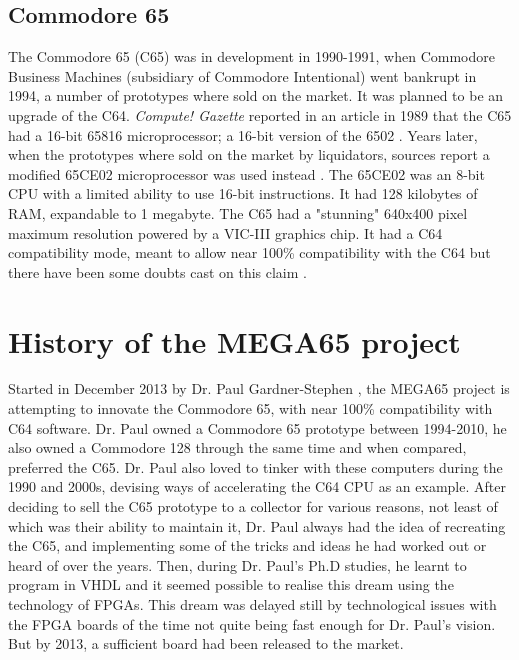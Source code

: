\subsection{Commodore 65}
The Commodore 65 (C65) was in development in 1990-1991, when Commodore Business Machines (subsidiary of Commodore Intentional) went bankrupt in 1994, a number of prototypes where sold on the market. It was planned to be an upgrade of the C64. \textit{Compute! Gazette} reported in an article in 1989 that the C65 had a 16-bit 65816 microprocessor; a 16-bit version of the 6502 
\cite{RN31}. Years later, when the prototypes where sold on the market by liquidators, sources report a modified 65CE02 microprocessor was used instead
\cite{RN30}
\cite{RN78}. The 65CE02 was an 8-bit CPU with a limited ability to use 16-bit instructions. It had 128 kilobytes of RAM, expandable to 1 megabyte. The C65 had a "stunning" 640x400 pixel maximum resolution 
\cite{RN31} powered by a VIC-III graphics chip. It had a C64 compatibility mode, meant to allow near 100\% compatibility with the C64 but there have been some doubts cast on this claim
\cite{RN30}. 

\section{History of the MEGA65 project}
Started in December 2013 by Dr. Paul Gardner-Stephen 
\cite{RN44}, the MEGA65 project is attempting to innovate the Commodore 65, with near 100\% compatibility with C64 software. Dr. Paul owned a Commodore 65 prototype between 1994-2010, he also owned a Commodore 128 through the same time and when compared, preferred the C65. Dr. Paul also loved to tinker with these computers during the 1990 and 2000s, devising ways of accelerating the C64 CPU as an example. After deciding to sell the C65 prototype to a collector for various reasons, not least of which was their ability to maintain it, Dr. Paul always had the idea of recreating the C65, and implementing some of the tricks and ideas he had worked out or heard of over the years. Then, during Dr. Paul's Ph.D studies, he learnt to program in VHDL and it seemed possible to realise this dream using the technology of FPGAs. This dream was delayed still by technological issues with the FPGA boards of the time not quite being fast enough for Dr. Paul's vision. But by 2013, a sufficient board had been released to the market. \\\\

